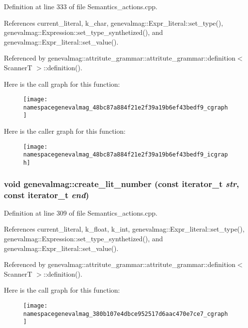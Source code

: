 Definition at line 333 of file Semantics\_\-actions.cpp.

References current\_\-literal, k\_\-char, genevalmag::Expr\_\-literal::set\_\-type(), genevalmag::Expression::set\_\-type\_\-synthetized(), and genevalmag::Expr\_\-literal::set\_\-value().

Referenced by genevalmag::attritute\_\-grammar::attritute\_\-grammar::definition$<$ ScannerT $>$::definition().

Here is the call graph for this function:\nopagebreak
\begin{figure}[H]
\begin{center}
\leavevmode
\texttt{[image: namespacegenevalmag\_48bc87a884f21e2f39a19b6ef43bedf9\_cgraph]}
\end{center}
\end{figure}


Here is the caller graph for this function:\nopagebreak
\begin{figure}[H]
\begin{center}
\leavevmode
\texttt{[image: namespacegenevalmag\_48bc87a884f21e2f39a19b6ef43bedf9\_icgraph]}
\end{center}
\end{figure}
\hypertarget{namespacegenevalmag_380b107e4dbce952517d6aac470e7ce7}{
\subsubsection[{create\_\-lit\_\-number}]{\setlength{\rightskip}{0pt plus 5cm}void genevalmag::create\_\-lit\_\-number (const iterator\_\-t {\em str}, \/  const iterator\_\-t {\em end})}}
\label{namespacegenevalmag_380b107e4dbce952517d6aac470e7ce7}




Definition at line 309 of file Semantics\_\-actions.cpp.

References current\_\-literal, k\_\-float, k\_\-int, genevalmag::Expr\_\-literal::set\_\-type(), genevalmag::Expression::set\_\-type\_\-synthetized(), and genevalmag::Expr\_\-literal::set\_\-value().

Referenced by genevalmag::attritute\_\-grammar::attritute\_\-grammar::definition$<$ ScannerT $>$::definition().

Here is the call graph for this function:\nopagebreak
\begin{figure}[H]
\begin{center}
\leavevmode
\texttt{[image: namespacegenevalmag\_380b107e4dbce952517d6aac470e7ce7\_cgraph]}
\end{center}
\end{figure}


